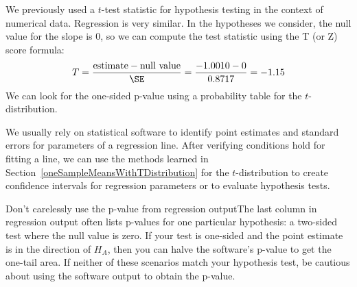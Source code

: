 We previously used a $t$-test statistic for hypothesis testing in the context of numerical data. Regression is very similar. In the hypotheses we consider, the null value for the slope is 0, so we can compute the test statistic using the T (or Z) score formula:
\begin{align*}
T = \frac{\text{estimate} - \text{null value}}{\SE} = \frac{-1.0010 - 0}{0.8717} = -1.15
\end{align*}
We can look for the one-sided p-value
using a probability table for the $t$-distribution.



\begin{termBox}{
We usually rely on statistical software to identify point estimates and standard errors for parameters of a regression line. After verifying conditions hold for fitting a line, we can use the methods learned in Section~\ref{oneSampleMeansWithTDistribution} for the $t$-distribution to create confidence intervals for regression parameters or to evaluate hypothesis tests.}
\end{termBox}

\begin{caution}{Don't carelessly use the p-value from regression output}{The last column in regression output often lists p-values for one particular hypothesis: a two-sided test where the null value is zero. If your test is one-sided and the point estimate is in the direction of $H_A$, then you can halve the software's p-value to get the one-tail area. If neither of these scenarios match your hypothesis test, be cautious about using the software output to obtain the p-value.}
\end{caution}


